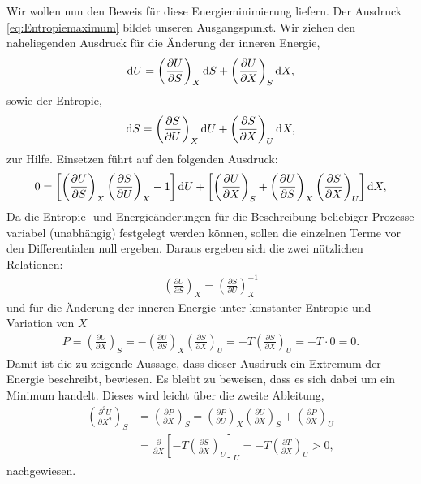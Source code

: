 Wir wollen nun den Beweis für diese Energieminimierung liefern.
Der Ausdruck \ref{eq:Entropiemaximum} bildet unseren Ausgangspunkt. Wir ziehen den naheliegenden Ausdruck für die Änderung der inneren Energie, 
\begin{align*}
    \mathop{}\!\mathrm{d} U=\left( \frac{\partial U}{\partial S}  \right)_X \mathop{}\!\mathrm{d} S + \left( \frac{\partial U}{\partial X}  \right)_S \mathop{}\!\mathrm{d} X,
\end{align*}
sowie der Entropie,
\begin{align*}
    \mathop{}\!\mathrm{d} S=\left( \frac{\partial S}{\partial U}  \right)_X \mathop{}\!\mathrm{d} U + \left( \frac{\partial S}{\partial X}  \right)_U \mathop{}\!\mathrm{d} X,
\end{align*}
zur Hilfe.
Einsetzen führt auf den folgenden Ausdruck:
\begin{align*}
    0=\left[\left( \frac{\partial U}{\partial S}  \right)_X\left( \frac{\partial S}{\partial U}  \right)_X -1\right]\mathop{}\!\mathrm{d} U + \left[\left( \frac{\partial U}{\partial X}  \right)_S+\left( \frac{\partial U}{\partial S}  \right)_X\left( \frac{\partial S}{\partial X}  \right)_U \right]\mathop{}\!\mathrm{d} X,
\end{align*}
Da die Entropie- und Energieänderungen für die Beschreibung beliebiger Prozesse variabel (unabhängig) festgelegt werden können, sollen die einzelnen Terme vor den Differentialen null ergeben.
Daraus ergeben sich die zwei nützlichen Relationen:
\begin{align*}
    \left( \frac{\partial U}{\partial S}  \right)_X=\left( \frac{\partial S}{\partial U}  \right)_X^{-1}
\end{align*}
und für die Änderung der inneren Energie unter konstanter Entropie und Variation von $X$
\begin{align*}
    P=\left( \frac{\partial U}{\partial X}  \right)_S=-\left( \frac{\partial U}{\partial S}  \right)_X\left( \frac{\partial S}{\partial X}  \right)_U=-T\left( \frac{\partial S}{\partial X}  \right)_U=-T\cdot0=0.
\end{align*}
Damit ist die zu zeigende Aussage, dass dieser Ausdruck ein Extremum der Energie beschreibt, bewiesen.
Es bleibt zu beweisen, dass es sich dabei um ein Minimum handelt.
Dieses wird leicht über die zweite Ableitung,
\begin{align*}
    \left( \frac{\partial ^2U}{\partial X^2}  \right)_S&=\left( \frac{\partial P}{\partial X}  \right)_S=\left( \frac{\partial P}{\partial U}  \right)_X\left( \frac{\partial U}{\partial X}  \right)_S+\left( \frac{\partial P}{\partial X}  \right)_U\\
    &=\frac{\partial}{\partial X}\left[-T\left( \frac{\partial S}{\partial X}  \right)_U\right]_U =-T\left( \frac{\partial T}{\partial X}  \right)_U>0,
\end{align*}
nachgewiesen.

